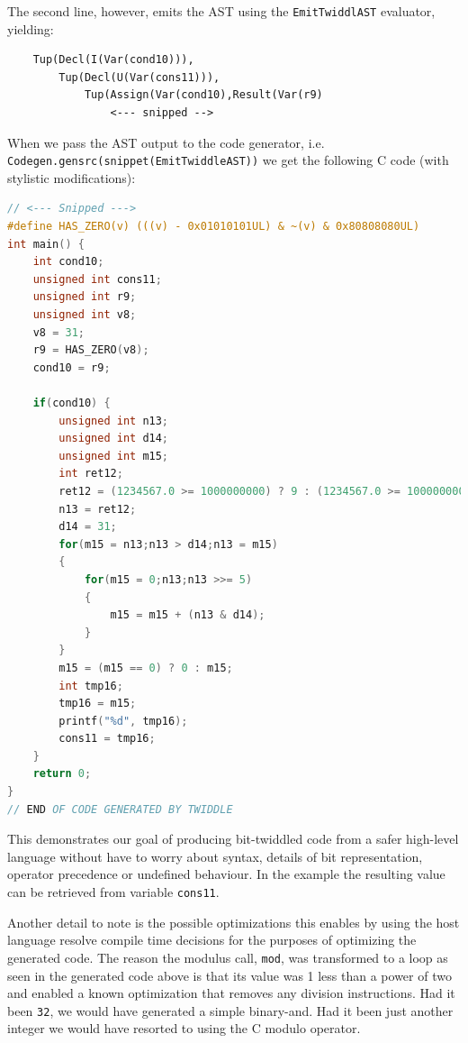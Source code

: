 \documentclass{article}
\begin{document}
	The second line, however, emits the AST using the \texttt{EmitTwiddlAST} evaluator, yielding:
\begin{verbatim}
	Tup(Decl(I(Var(cond10))),
		Tup(Decl(U(Var(cons11))),
			Tup(Assign(Var(cond10),Result(Var(r9)
				<--- snipped -->
\end{verbatim}

When we pass the AST output to the code generator, i.e. \texttt{Codegen.gensrc(snippet(EmitTwiddleAST))} we get the following C code (with stylistic modifications):

\begin{lstlisting}[language=C]
// <--- Snipped --->
#define HAS_ZERO(v) (((v) - 0x01010101UL) & ~(v) & 0x80808080UL)
int main() {
    int cond10;
    unsigned int cons11;
    unsigned int r9;
    unsigned int v8;
    v8 = 31;
    r9 = HAS_ZERO(v8);
    cond10 = r9;

    if(cond10) {
        unsigned int n13;
        unsigned int d14;
        unsigned int m15;
        int ret12;
        ret12 = (1234567.0 >= 1000000000) ? 9 : (1234567.0 >= 100000000) ? 8 : (1234567.0 >= 10000000) ? 7 : (1234567.0 >= 1000000) ? 6 : (1234567.0 >= 100000) ? 5 : (1234567.0 >= 10000) ? 4 : (1234567.0 >= 1000) ? 3 : (1234567.0 >= 100) ? 2 : (1234567.0 >= 10) ? 1 : 0;
        n13 = ret12;
        d14 = 31;
        for(m15 = n13;n13 > d14;n13 = m15)
        {
            for(m15 = 0;n13;n13 >>= 5)
            {
                m15 = m15 + (n13 & d14);
            }
        }
        m15 = (m15 == 0) ? 0 : m15;
        int tmp16;
        tmp16 = m15;
        printf("%d", tmp16);
        cons11 = tmp16;
    }
    return 0;
}
// END OF CODE GENERATED BY TWIDDLE
\end{lstlisting}

This demonstrates our goal of producing bit-twiddled code from a safer high-level language without have to worry about syntax, details of bit representation, operator precedence or undefined behaviour. In the example  the resulting value can be retrieved from variable \texttt{cons11}.

Another detail to note is the possible optimizations this enables by using the host language resolve compile time decisions for the purposes of optimizing the generated code. The reason the modulus call, \texttt{mod}, was transformed to a loop as seen in the generated code above is that its
value was 1 less than a power of two and enabled a known optimization that removes any division instructions. Had it been \texttt{32}, we would have generated a simple binary-and. Had it been just another integer we would have resorted to using the C modulo operator.
\end{document}
